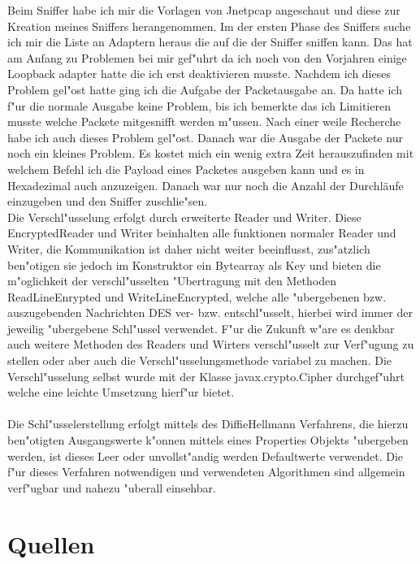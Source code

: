 \documentclass[a4paper,12pt]{scrreprt}
\begin{document}
Beim Sniffer habe ich mir die Vorlagen von Jnetpcap angeschaut und diese zur Kreation meines Sniffers herangenommen.
Im der ersten Phase des Sniffers suche ich mir die Liste an Adaptern heraus die auf die der Sniffer sniffen kann.
Das hat am Anfang zu Problemen bei mir gef"uhrt da ich noch von den Vorjahren einige Loopback adapter hatte die ich erst deaktivieren musste. Nachdem ich dieses Problem gel"ost hatte ging ich die Aufgabe der Packetausgabe an. Da hatte ich f"ur die normale Ausgabe keine Problem, bis ich bemerkte das ich Limitieren musste welche Packete mitgesnifft werden m"ussen. Nach einer weile Recherche habe ich auch dieses Problem gel"ost. Danach war die Ausgabe der Packete nur noch ein kleines Problem. Es kostet mich ein wenig extra Zeit herauszufinden mit welchem Befehl ich die Payload eines Packetes ausgeben kann und es in Hexadezimal auch anzuzeigen. Danach war nur noch die Anzahl der Durchläufe einzugeben und den Sniffer zuschlie"sen. 
\\Die Verschl"usselung erfolgt durch erweiterte Reader und Writer. Diese EncryptedReader und Writer beinhalten alle funktionen normaler Reader und Writer, die Kommunikation ist daher nicht weiter beeinflusst, zus"atzlich ben"otigen sie jedoch im Konstruktor ein Bytearray als Key und bieten die m"oglichkeit der verschl"usselten "Ubertragung mit den Methoden ReadLineEnrypted und WriteLineEncrypted, welche alle "ubergebenen bzw. auszugebenden Nachrichten DES ver- bzw. entschl"usselt, hierbei wird immer der jeweilig "ubergebene Schl"ussel verwendet. F"ur die Zukunft w"are es denkbar auch weitere Methoden des Readers und Wirters verschl"usselt zur Verf"ugung zu stellen oder aber auch die Verschl"usselungsmethode variabel zu machen. Die Verschl"usselung selbst wurde mit der Klasse javax.crypto.Cipher durchgef"uhrt welche eine leichte Umsetzung hierf"ur bietet.\\
\\Die Schl"usselerstellung erfolgt mittels des DiffieHellmann Verfahrens, die hierzu ben"otigten Ausgangswerte k"onnen mittels eines Properties Objekts "ubergeben werden, ist dieses Leer oder unvollst"andig werden Defaultwerte verwendet. Die f"ur dieses Verfahren notwendigen und verwendeten Algorithmen sind allgemein verf"ugbar und nahezu "uberall einsehbar.
\chapter{Quellen}
\end{document}
